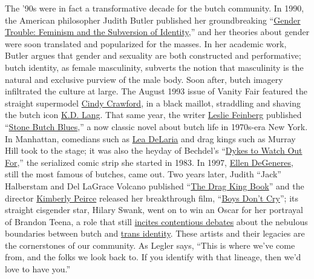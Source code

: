 The '90s were in fact a transformative decade for the butch community.
In 1990, the American philosopher Judith Butler published her
groundbreaking
``\href{https://www.routledge.com/Gender-Trouble-Feminism-and-the-Subversion-of-Identity-1st-Edition/Butler/p/book/9780415389556}{Gender
Trouble: Feminism and the Subversion of Identity},'' and her theories
about gender were soon translated and popularized for the masses. In her
academic work, Butler argues that gender and sexuality are both
constructed and performative; butch identity, as female masculinity,
subverts the notion that masculinity is the natural and exclusive
purview of the male body. Soon after, butch imagery infiltrated the
culture at large. The August 1993 issue of Vanity Fair featured the
straight supermodel
\href{https://www.nytimes.com/interactive/2015/10/21/t-magazine/21taketwo-degrasse-crawford.html}{Cindy
Crawford}, in a black maillot, straddling and shaving the butch icon
\href{https://www.nytimes.com/topic/person/k-d-lang}{K.D. Lang}. That
same year, the writer
\href{https://www.nytimes.com/2014/11/25/nyregion/leslie-feinberg-writer-and-transgender-activist-dies-at-65.html}{Leslie
Feinberg} published
``\href{https://microcosmpublishing.com/catalog/books/10392}{Stone Butch
Blues},'' a now classic novel about butch life in 1970s-era New York. In
Manhattan, comedians such as
\href{https://www.nytimes.com/2006/04/30/theater/girl-youre-a-man-now.html}{Lea
DeLaria} and drag kings such as Murray Hill took to the stage; it was
also the heyday of Bechdel's
``\href{https://www.indiebound.org/book/9780618968800}{Dykes to Watch
Out For},'' the serialized comic strip she started in 1983. In 1997,
\href{https://www.nytimes.com/topic/person/ellen-degeneres}{Ellen
DeGeneres}, still the most famous of butches, came out. Two years later,
Judith ``Jack'' Halberstam and Del LaGrace Volcano published
``\href{https://www.abebooks.com/9781852426071/Drag-King-Book-Halberstam-Judith-1852426071/plp}{The
Drag King Book}'' and the director
\href{https://www.nytimes.com/2013/09/29/magazine/carrie-is-back-so-is-kimberly-peirce.html}{Kimberly
Peirce} released her breakthrough film,
``\href{https://www.nytimes.com/watching/titles/movies/1000037931}{Boys
Don't Cry}''; its straight cisgender star, Hilary Swank, went on to win
an Oscar for her portrayal of Brandon Teena, a role that still
\href{https://www.nytimes.com/2019/10/09/movies/boys-dont-cry-anniversary.html}{incites
contentious debates} about the nebulous boundaries between butch and
\href{https://www.nytimes.com/2020/02/04/t-magazine/trans-actors.html}{trans
identity}. These artists and their legacies are the cornerstones of our
community. As Legler says, ``This is where we've come from, and the
folks we look back to. If you identify with that lineage, then we'd love
to have you.''

